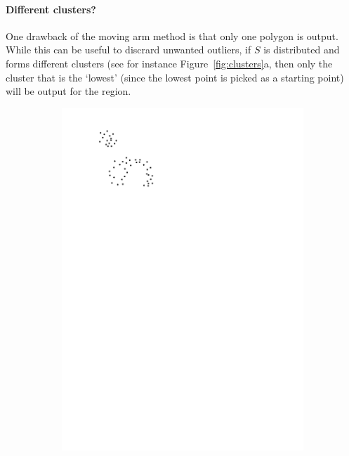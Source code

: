 \paragraph{Different clusters?} 
One drawback of the moving arm method is that only one polygon is output.
While this can be useful to discrard unwanted outliers, if $S$ is distributed and forms different clusters (see for instance Figure~\ref{fig:clusters}a, then only the cluster that is the `lowest' (since the lowest point is picked as a starting point) will be output for the region.
\begin{figure}
  \centering
  \begin{subfigure}[b]{0.35\linewidth}
    \centering
    \includegraphics[page=1,width=\textwidth]{figs/clusters.pdf}
    \caption{}
  \end{subfigure}
  \qquad \qquad
  \begin{subfigure}[b]{0.35\linewidth}

\end{subfigure}
\end{figure}
